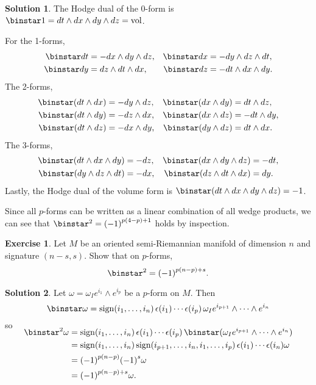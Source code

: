 \documentclass[11pt, a4paper]{report}
\theoremstyle{definition}
\newtheorem{exercise}{Exercise}[part]
\newtheorem{solution}{Solution}[part]
\newenvironment{ex}{\begin{exercise}}{\end{exercise}\pagebreak[1]}
\newenvironment{sol}{\begin{solution}}{\end{solution}\pagebreak[3]}
\newcommand*{\op}[1]{\ensuremath\mathop{}\mathopen{}#1}
\renewcommand*{\star}{\op{\binstar}\mathord{}}
\DeclareMathOperator{\sign}{sign}
\begin{document}
\begin{sol}

The Hodge dual of the 0-form is $\star 1 = dt \wedge dx \wedge dy \wedge dz = \text{vol}$.

For the 1-forms,
\begin{align*}
    \star dt &= - dx \wedge dy \wedge dz, &
    \star dx &= - dy \wedge dz \wedge dt, \\
    \star dy &= dz \wedge dt \wedge dx, &
    \star dz &= - dt \wedge dx \wedge dy.
\end{align*}
The 2-forms,
\begin{align*}
    \star (dt \wedge dx) &= - dy \wedge dz, &
    \star (dx \wedge dy) &= dt \wedge dz, \\
    \star (dt \wedge dy) &= - dz \wedge dx, &
    \star (dx \wedge dz) &= - dt \wedge dy, \\
    \star (dt \wedge dz) &= - dx \wedge dy, &
    \star (dy \wedge dz) &= dt \wedge dx.
\end{align*}
The 3-forms,
\begin{align*}
    \star(dt \wedge dx \wedge dy) &= - dz, &
    \star(dx \wedge dy \wedge dz) &= - dt, \\
    \star(dy \wedge dz \wedge dt) &= - dx, &
    \star(dz \wedge dt \wedge dx) &= dy.
\end{align*}
Lastly, the Hodge dual of the volume form is $\star (dt \wedge dx \wedge dy \wedge dz) = -1$.

Since all $p$-forms can be written as a linear combination of all wedge products, we can see that $\star^2 = {(-1)}^{p (4 - p) + 1}$ holds by inspection.

\end{sol}

\begin{ex}

Let $M$ be an oriented semi-Riemannian manifold of dimension $n$ and signature $(n-s, s)$. Show that on $p$-forms,
\[
    \star^2 = {(-1)}^{p (n - p) + s}.
\]

\end{ex}

\begin{sol}

Let $\omega = \omega_I e^{i_1} \wedge e^{i_p}$ be a $p$-form on $M$. Then
\[
    \star \omega = \sign(i_1, \ldots, i_n) \, \epsilon(i_1) \cdots \epsilon(i_p) \, \omega_I e^{i_{p + 1}} \wedge \cdots \wedge e^{i_n}
\]
so
\begin{align*}
    \SwapAboveDisplaySkip
    \star^2 \omega &= \sign(i_1, \ldots, i_n) \, \epsilon(i_1) \cdots \epsilon(i_p) \star (\omega_I e^{i_{p + 1}} \wedge \cdots \wedge e^{i_n}) \\
        &= \sign(i_1, \ldots, i_n) \sign(i_{p + 1}, \ldots, i_n, i_1, \ldots, i_p) \, \epsilon(i_1) \cdots \epsilon(i_n) \omega \\
        &= {(-1)}^{p (n - p)} {(-1)}^s \omega \\
        &= {(-1)}^{p (n - p) + s} \omega.
\end{align*}

\end{sol}
\end{document}
